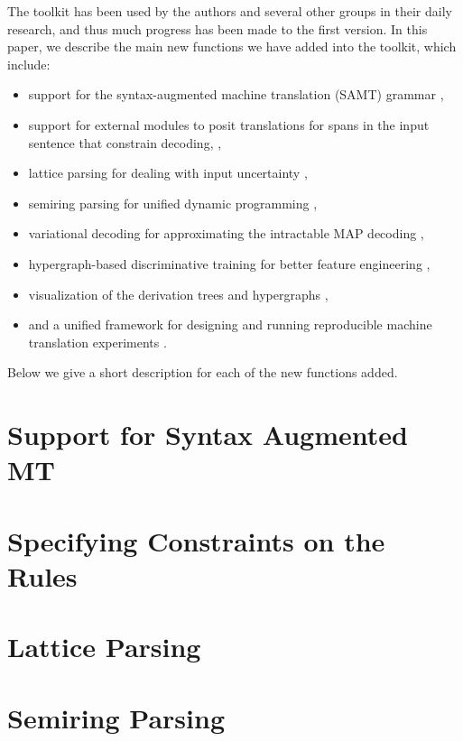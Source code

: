 \documentclass[11pt]{article}
\begin{document}
The toolkit has been used by the authors and several
other groups in their daily research, and thus much progress has
been made to the first version. 
In this paper, we describe the main new functions we have added into the 
toolkit, which include: 
\begin{itemize}
\item
support for the syntax-augmented machine translation (SAMT) grammar \cite{samt2006},
\item
support for external modules to posit translations for spans in the input sentence that constrain decoding,    \cite{PBML-2010-Josua-transliteration},  
\item
lattice parsing for dealing with input uncertainty \cite{dyer-muresan-resnik:2008:ACLMain},
\item
semiring parsing for unified dynamic programming \cite{li-eisner:2009:EMNLP} , 
\item
variational decoding for approximating the intractable MAP decoding \cite{variational-decoding-acl09},
\item
hypergraph-based discriminative training for better feature engineering \cite{zhifei-forest-reranking-galebook}, 
\item
visualization of the derivation trees and hypergraphs \cite{PBML-2010-Josua-visualization}, 
\item
and a unified framework for designing and running reproducible machine translation experiments \cite{Schwartz-wmt10-pipline}.
\end{itemize}
Below we give a short description for each of the new functions added.


\section{Support for Syntax Augmented MT}


\section{Specifying Constraints on the Rules}

\section{Lattice Parsing}


\section{Semiring Parsing}
\end{document}
